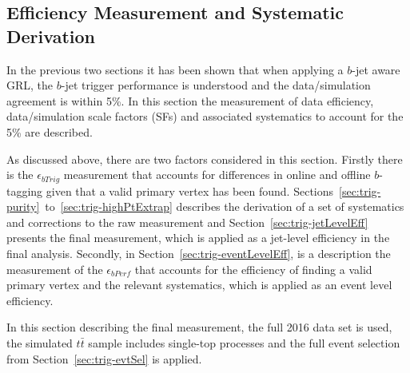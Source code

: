 \FloatBarrier
\newpage

\subsection{Efficiency Measurement and Systematic Derivation}
In the previous two sections it has been shown that when applying a $b$-jet aware GRL,
the $b$-jet trigger performance is understood and the data/simulation agreement is within 5\%.
In this section the measurement of data efficiency, data/simulation scale factors (SFs)
and associated systematics to account for the 5\% are described.

As discussed above, there are two factors considered in this section.
Firstly there is the $\epsilon_{bTrig}$ measurement
that accounts for differences in online and offline $b$-tagging given that a valid primary vertex has been found.
Sections~\ref{sec:trig-purity}~to~\ref{sec:trig-highPtExtrap} describes the derivation of a set of systematics and corrections to the raw measurement
and Section~\ref{sec:trig-jetLevelEff} presents the final measurement, which is applied as a jet-level efficiency in the final analysis.
Secondly, in Section~\ref{sec:trig-eventLevelEff}, is a description the measurement of the $\epsilon_{bPerf}$ that accounts
for the efficiency of finding a valid primary vertex and the relevant systematics, which is applied as an event level efficiency.

In this section describing the final measurement, the full 2016 data set is used,
the simulated ${t\bar{t}}$ sample includes single-top processes
and the full event selection from Section~\ref{sec:trig-evtSel} is applied.


